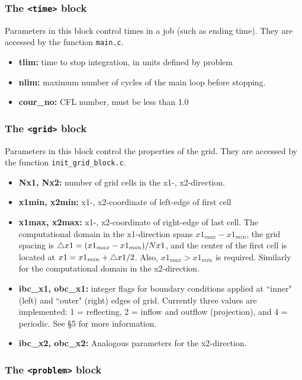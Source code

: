 \subsubsection{The {\tt <time>} block}

Parameters in this block control times in a job (such as ending time).
They are accessed by the function {\tt main.c}.
\begin{itemize}
\item {\bf tlim:} time to stop integration, in units defined by problem
\item {\bf nlim:} maximum number of cycles of the main loop before stopping.
\item {\bf cour\_no:}  CFL number, must be less than 1.0
\end{itemize}

\subsubsection{The {\tt <grid>} block}

Parameters in this block control the properties of the grid. 
They are accessed by the function {\tt init\_grid\_block.c}.
\begin{itemize}
\item {\bf Nx1, Nx2:} number of grid cells in the x1-, x2-direction.
\item {\bf x1min, x2min:} x1-, x2-coordinate of left-edge of first cell
\item {\bf x1max, x2max:} x1-, x2-coordinate of right-edge of last cell.
The computational domain in the x1-direction spans $x1_{max}-x1_{min}$, the grid
spacing is $\bigtriangleup x1=(x1_{max}-x1_{min})/Nx1$, and the center of the
first cell is located at $x1=x1_{min} + \bigtriangleup x1/2$. Also, $x1_{max} >
x1_{min}$ is required.  Similarly for the computational domain in the 
x2-direction.
\item {\bf ibc\_x1, obc\_x1:} integer flags for boundary conditions applied
at ``inner" (left) and ``outer" (right) edges of grid.  Currently three
values are implemented: 1 = reflecting, 2 = inflow and outflow (projection), 
and 4 = periodic.  See \S 5 for more information.
\item {\bf ibc\_x2, obc\_x2:} Analogous parameters for the x2-direction.
\end{itemize}

\subsubsection{The {\tt <problem>} block}

